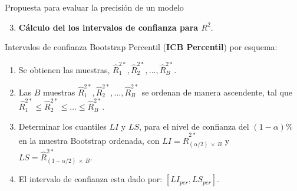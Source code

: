 \documentclass[serif, aspectratio=169]{beamer}
\begin{document}
\begin{frame}{Propuesta para evaluar la precisión de un modelo}
	
	\begin{enumerate}
		\setcounter{enumi}{2}
		\item {\large \textbf{Cálculo del los intervalos de confianza para $R^2$}.}\\
		\vspace{.2cm}
	\end{enumerate}
	
	Intervalos de confianza Bootstrap Percentil (\textbf{ICB Percentil}) por esquema:
	
	\begin{enumerate}
		\item Se obtienen las muestras, $\hat{R}^{2*}_{1} , \hat{R}^{2*}_{2}, \dots,\hat{R}^{2*}_{B}$.
		
		\item Las $B$ muestras $\hat{R}^{2*}_{1}, \hat{R}^{2*}_{2},\dots, \hat{R}^{2*}_{B} $ se ordenan de manera ascendente, tal que $\hat{R}^{2*}_{1} \leq \hat{R}^{2*}_{2} \leq \dots \leq \hat{R}^{2*}_{B} $.
		
		\item Determinar los cuantiles $LI$ y $LS$, para el nivel de confianza del $(1-\alpha)$\% en la muestra Bootstrap ordenada, con $LI = \hat{R}^{2*}_{ ( \alpha/2 ) \: \times \: B} $ y $LS = \hat{R}^{2*}_{ (1 - \alpha/2) \: \times \: B} $.
		
		\item El intervalo de confianza esta dado por: $[LI_{per}, LS_{per}]$.
	\end{enumerate}
	 
\end{frame}
\end{document}
